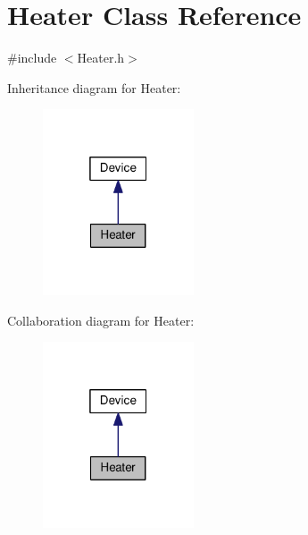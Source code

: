 \hypertarget{class_heater}{}\section{Heater Class Reference}
\label{class_heater}


{\ttfamily \#include $<$Heater.\+h$>$}



Inheritance diagram for Heater\+:
\nopagebreak
\begin{figure}[H]
\begin{center}
\leavevmode
\includegraphics[width=127pt]{class_heater__inherit__graph}
\end{center}
\end{figure}


Collaboration diagram for Heater\+:
\nopagebreak
\begin{figure}[H]
\begin{center}
\leavevmode
\includegraphics[width=127pt]{class_heater__coll__graph}
\end{center}
\end{figure}

